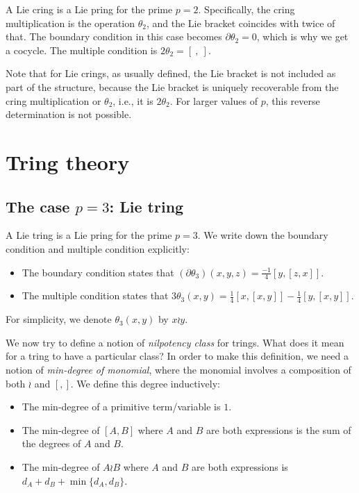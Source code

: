 \documentclass[10pt]{amsart}
\begin{document}
A Lie cring is a Lie pring for the prime $p = 2$. Specifically, the
cring multiplication is the operation $\theta_2$, and the Lie bracket
coincides with twice of that. The boundary condition in this case
becomes $\partial \theta_2 = 0$, which is why we get a cocycle. The
multiple condition is $2\theta_2 = [ \ , \ ]$.

Note that for Lie crings, as usually defined, the Lie bracket is not
included as part of the structure, because the Lie bracket is uniquely
recoverable from the cring multiplication or $\theta_2$, i.e., it is
$2\theta_2$. For larger values of $p$, this reverse determination is
not possible.

\section{Tring theory}
\subsection{The case $p = 3$: Lie tring}

A Lie tring is a Lie pring for the prime $p = 3$. We write down the
boundary condition and multiple condition explicitly:

\begin{itemize}
\item The boundary condition states that $(\partial\theta_3)(x,y,z) =
  \frac{-1}{4}[y,[z,x]]$.
\item The multiple condition states that $3\theta_3(x,y) =
  \frac{1}{4}[x,[x,y]] - \frac{1}{4}[y,[x,y]]$.
\end{itemize}

For simplicity, we denote $\theta_3(x,y)$ by $x \wr y$. 

We now try to define a notion of {\em nilpotency class} for
trings. What does it mean for a tring to have a particular class? In
order to make this definition, we need a notion of {\em min-degree of
monomial}, where the monomial involves a composition of both $\wr$ and
$[,]$. We define this degree inductively: 

\begin{itemize}
\item The min-degree of a primitive term/variable is $1$.
\item The min-degree of $[A,B]$ where $A$ and $B$ are both expressions is
  the sum of the degrees of $A$ and $B$.
\item The min-degree of $A \wr B$ where $A$ and $B$ are both expressions
  is $d_A + d_B + \min \{ d_A,d_B\}$.
\end{itemize}
\end{document}
